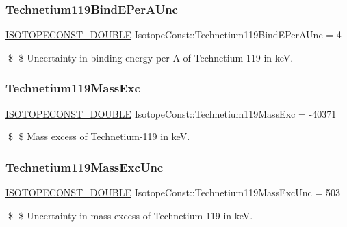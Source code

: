 \subsubsection{\texorpdfstring{Technetium119\+Bind\+E\+Per\+A\+Unc}{Technetium119BindEPerAUnc}}
{\footnotesize\ttfamily \mbox{\hyperlink{group___isotope_const-_macros_ga8f45a7272ce02c0b4c65c44636ed719a}{I\+S\+O\+T\+O\+P\+E\+C\+O\+N\+S\+T\+\_\+\+D\+O\+U\+B\+LE}} Isotope\+Const\+::\+Technetium119\+Bind\+E\+Per\+A\+Unc = 4}

\$ \$ Uncertainty in binding energy per A of Technetium-\/119 in keV. \mbox{\label{group___isotope_const-_technetium-_tc119_ga0ff968fbc473674549680f4637ac30c3}} 
\subsubsection{\texorpdfstring{Technetium119\+Mass\+Exc}{Technetium119MassExc}}
{\footnotesize\ttfamily \mbox{\hyperlink{group___isotope_const-_macros_ga8f45a7272ce02c0b4c65c44636ed719a}{I\+S\+O\+T\+O\+P\+E\+C\+O\+N\+S\+T\+\_\+\+D\+O\+U\+B\+LE}} Isotope\+Const\+::\+Technetium119\+Mass\+Exc = -\/40371}

\$ \$ Mass excess of Technetium-\/119 in keV. \mbox{\label{group___isotope_const-_technetium-_tc119_gaa9ab0f96909c3dc96fafb6a593a0f6be}} 
\subsubsection{\texorpdfstring{Technetium119\+Mass\+Exc\+Unc}{Technetium119MassExcUnc}}
{\footnotesize\ttfamily \mbox{\hyperlink{group___isotope_const-_macros_ga8f45a7272ce02c0b4c65c44636ed719a}{I\+S\+O\+T\+O\+P\+E\+C\+O\+N\+S\+T\+\_\+\+D\+O\+U\+B\+LE}} Isotope\+Const\+::\+Technetium119\+Mass\+Exc\+Unc = 503}

\$ \$ Uncertainty in mass excess of Technetium-\/119 in keV. \mbox{\label{group___isotope_const-_technetium-_tc119_gacd28112ef733cfd2d000368d536d69a2}} 
